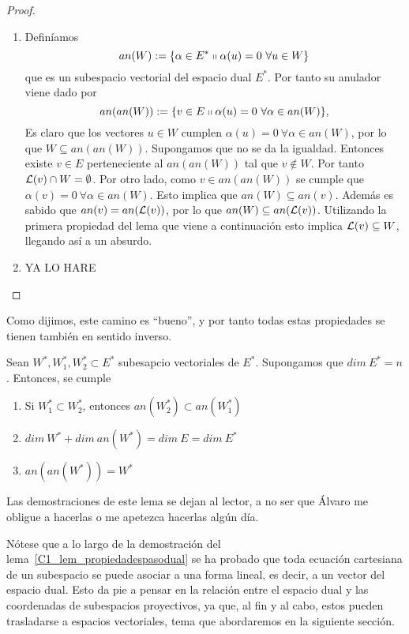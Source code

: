 \begin{proof}
\begin{enumerate}
		\item Definíamos 
		\begin{equation*}
			an(W):=\{\alpha\in E^*\shortparallel \alpha(u)=0 \ \forall u\in W\}
		\end{equation*}
		que es un subespacio vectorial del espacio dual $E^*$. Por tanto su anulador viene dado por
		\begin{equation*}
		an(an(W)):=\{v\in E\shortparallel \alpha(u)=0 \ \forall \alpha\in an(W)\},
		\end{equation*}
		Es claro que los vectores $u\in W$ cumplen $\alpha(u)=0 \ \forall \alpha\in an(W)$, por lo que $W\subseteq an(an(W))$. Supongamos que no se da la igualdad. Entonces existe $v\in E$ perteneciente al $an(an(W))$ tal que $v\not\in W$. Por tanto $\mathcal{L}(v)\cap W=\emptyset$. Por otro lado, como $v\in an(an(W))$ se cumple que $\alpha(v)=0 \ \forall \alpha\in an(W)$. Esto implica que $an(W)\subseteq an(v)$. Además es sabido que $an(v)=an(\mathcal{L}(v))$, por lo que $an(W)\subseteq an(\mathcal{L}(v))$. Utilizando la primera propiedad del lema que viene a continuación esto implica $\mathcal{L}(v)\subseteq W$, llegando así a un absurdo.
		
		\item YA LO HARE
	\end{enumerate}
\end{proof}
Como dijimos, este camino es ``bueno'', y por tanto todas estas propiedades se tienen también en sentido inverso.
\begin{lem}
	Sean $W^*,W_1^*,W_2^*\subset E^*$ subesapcio vectoriales de $E^*$. Supongamos que $dim \ E^*=n$. Entonces, se cumple
	\begin{enumerate}
		\item Si $W_1^*\subset W_2^*$, entonces $an(W_2^*)\subset an(W_1^*)$
		
		\item $dim \ W^*+dim \ an(W^*)=dim \ E=dim \ E^*$
		
		\item $an(an(W^*))=W^*$
	\end{enumerate}
\end{lem}
Las demostraciones de este lema se dejan al lector, a no ser que Álvaro me obligue a hacerlas o me apetezca hacerlas algún día.

Nótese que a lo largo de la demostración del lema~\ref{C1_lem_propiedadespasodual} se ha probado que toda ecuación cartesiana de un subespacio se puede asociar a una forma lineal, es decir, a un vector del espacio dual. Esto da pie a pensar en la relación entre el espacio dual y las coordenadas de subespacios proyectivos, ya que, al fin y al cabo, estos pueden trasladarse a espacios vectoriales, tema que abordaremos en la siguiente sección.

